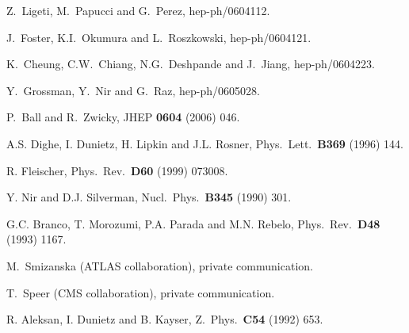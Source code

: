 \documentclass[12pt]{article}
\begin{document}
\begin{thebibliography}{999}
Z.~Ligeti, M.~Papucci and G.~Perez,
  hep-ph/0604112.
  
J.~Foster, K.I.~Okumura and L.~Roszkowski,
  hep-ph/0604121.
  
K.~Cheung, C.W.~Chiang, N.G.~Deshpande and J.~Jiang,
  hep-ph/0604223.
  
Y.~Grossman, Y.~Nir and G.~Raz,
  hep-ph/0605028.
  
P.~Ball and R.~Zwicky,
 { JHEP} {\bf 0604} (2006) 046.

A.S. Dighe, I. Dunietz, H. Lipkin and J.L. Rosner,
  { Phys.\ Lett.}~{\bf B369} (1996) 144.

R. Fleischer,
  { Phys.\ Rev.}~{\bf D60} (1999) 073008.
  
Y. Nir and D.J. Silverman,
  { Nucl.\ Phys.}~{\bf B345} (1990) 301.

G.C. Branco, T. Morozumi, P.A. Parada and M.N. Rebelo,
 { Phys.\ Rev.}~{\bf D48} (1993) 1167.
  
M.~Smizanska (ATLAS collaboration), private communication.

T.~Speer (CMS collaboration), private communication.

R. Aleksan, I. Dunietz and B. Kayser,
{ Z.\ Phys.}~{\bf C54} (1992) 653.


\end{thebibliography}
\end{document}
